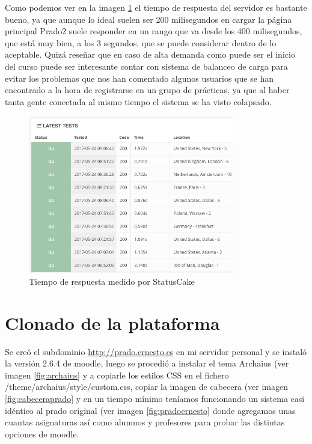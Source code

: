 \bigskip
Como podemos ver en la imagen \ref{fig:statuscake2} el tiempo de respuesta del servidor es bastante bueno, ya que aunque lo ideal suelen ser 200 milisegundos en cargar la página principal Prado2 suele responder en un rango que va desde los 400 milisegundos, que está muy bien, a los 3 segundos, que se puede considerar dentro de lo aceptable. Quizá reseñar que en caso de alta demanda como puede ser el inicio del curso puede ser interesante contar con sistema de balanceo de carga para evitar los problemas que nos han comentado algunos usuarios que se han encontrado a la hora de registrarse en un grupo de prácticas, ya que al haber tanta gente conectada al mismo tiempo el sistema se ha visto colapsado. 



\begin{figure}[H]
\centering
\includegraphics[width=0.8\textwidth]{../screenshots/statuscake2}
\caption{Tiempo de respuesta medido por StatusCake}
\label{fig:statuscake2}
\end{figure}


\section{Clonado de la plataforma}

Se creó el subdominio \url{http://prado.ernesto.es} en mi servidor personal y se instaló la versión 2.6.4 de moodle, luego se procedió a instalar el tema Archaius  (ver imagen \ref{fig:archaius} y a copiarle los estilos CSS en el fichero /theme/archaius/style/custom.css, copiar la imagen de cabecera (ver imagen \ref{fig:cabeceraprado} y en un tiempo mínimo teníamos funcionando un sistema casi idéntico al prado original (ver imagen \ref{fig:pradoernesto} donde agregamos unas cuantas asignaturas así como alumnos y profesores para probar las distintas opciones de moodle.


